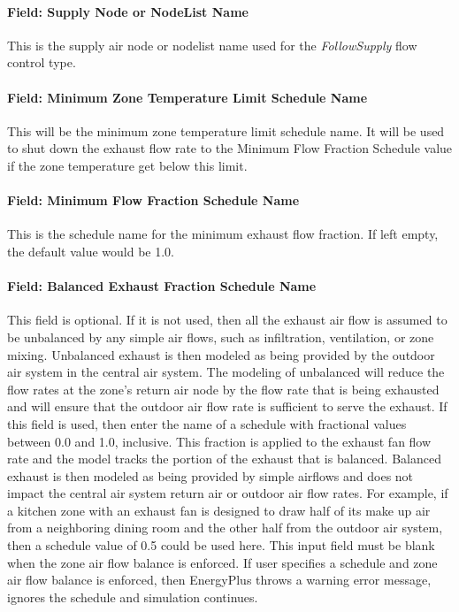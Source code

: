\paragraph{Field: Supply Node or NodeList Name}

This is the supply air node or nodelist name used for the \emph{FollowSupply} flow control type.

\paragraph{Field: Minimum Zone Temperature Limit Schedule Name}

This will be the minimum zone temperature limit schedule name. It will be used to shut down the exhaust flow rate to the Minimum Flow Fraction Schedule value if the zone temperature get below this limit.

\paragraph{Field: Minimum Flow Fraction Schedule Name}

This is the schedule name for the minimum exhaust flow fraction. If left empty, the default value would be 1.0.

\paragraph{Field: Balanced Exhaust Fraction Schedule Name}

This field is optional. If it is not used, then all the exhaust air flow is assumed to be unbalanced by any simple air flows, such as infiltration, ventilation, or zone mixing. Unbalanced exhaust is then modeled as being provided by the outdoor air system in the central air system. The modeling of unbalanced will reduce the flow rates at the zone’s return air node by the flow rate that is being exhausted and will ensure that the outdoor air flow rate is sufficient to serve the exhaust. If this field is used, then enter the name of a schedule with fractional values between 0.0 and 1.0, inclusive. This fraction is applied to the exhaust fan flow rate and the model tracks the portion of the exhaust that is balanced. Balanced exhaust is then modeled as being provided by simple airflows and does not impact the central air system return air or outdoor air flow rates. For example, if a kitchen zone with an exhaust fan is designed to draw half of its make up air from a neighboring dining room and the other half from the outdoor air system, then a schedule value of 0.5 could be used here. This input field must be blank when the zone air flow balance is enforced. If user specifies a schedule and zone air flow balance is enforced, then EnergyPlus throws a warning error message, ignores the schedule and simulation continues.

